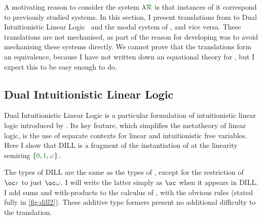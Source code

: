 \newcommand\instDILL{\gr{01\omega}}
\newcommand\instPD{\gr{01\Box}}

\newcommand\unused{\gr0}
\newcommand\true{\gr1}
\newcommand\valid{\gr\Box}

A motivating reason to consider the system $\name$ is that
instances of it correspond to previously studied systems.
In this section, I present translations from \name{} to Dual Intuitionistic
Linear Logic~\citep{Barber1996} and the modal system of \citet{judgmental},
and vice versa.
These translations are not mechanised, as part of the reason for developing
\name{} was to avoid mechanising these systems directly.
We cannot prove that the translations form an equivalence, because I have not
written down an equational theory for \name{}, but I expect this to be easy
enough to do.

\subsection{Dual Intuitionistic Linear Logic}\label{sec:trans-dill}

Dual Intuitionistic Linear Logic is a particular formulation of intuitionistic
linear logic introduced by \citet{Barber1996}.
Its key feature, which simplifies the metatheory of linear logic, is the use of
separate contexts for linear and intuitionistic free variables.
Here I show that DILL is a fragment of the instantiation of \name{} at the
linearity semiring $\{\gr0, \gr1, \gr\omega\}$.

The types of DILL are the same as the types of \name, except for the
restriction of $\oc\gr{r}$ to just $\oc\gr\omega$.
I will write the latter simply as $\oc$ when it appears in DILL\@.
I add sums and with-products to the calculus of \cite{Barber1996}, with the
obvious rules (stated fully in \cref{fig:dill2}).
These additive type formers present no additional difficulty to the translation.

